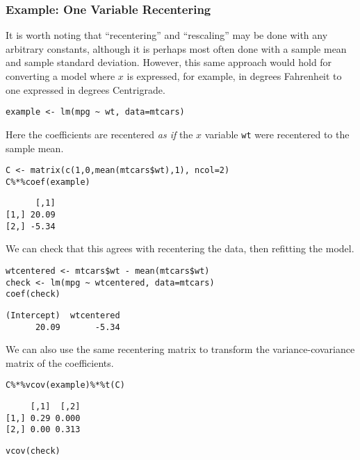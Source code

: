 \documentclass[]{article}
\begin{document}
\subsubsection{Example: One Variable
Recentering}\label{example-one-variable-recentering}

It is worth noting that ``recentering'' and ``rescaling'' may be done
with any arbitrary constants, although it is perhaps most often done
with a sample mean and sample standard deviation. However, this same
approach would hold for converting a model where \(x\) is expressed, for
example, in degrees Fahrenheit to one expressed in degrees Centrigrade.

\begin{verbatim}
example <- lm(mpg ~ wt, data=mtcars)
\end{verbatim}

Here the coefficients are recentered \emph{as if} the \(x\) variable
\texttt{wt} were recentered to the sample mean.

\begin{verbatim}
C <- matrix(c(1,0,mean(mtcars$wt),1), ncol=2)
C%*%coef(example)
\end{verbatim}

\begin{verbatim}
      [,1]
[1,] 20.09
[2,] -5.34
\end{verbatim}

We can check that this agrees with recentering the data, then refitting
the model.

\begin{verbatim}
wtcentered <- mtcars$wt - mean(mtcars$wt)
check <- lm(mpg ~ wtcentered, data=mtcars)
coef(check)
\end{verbatim}

\begin{verbatim}
(Intercept)  wtcentered 
      20.09       -5.34 
\end{verbatim}

We can also use the same recentering matrix to transform the
variance-covariance matrix of the coefficients.

\begin{verbatim}
C%*%vcov(example)%*%t(C)
\end{verbatim}

\begin{verbatim}
     [,1]  [,2]
[1,] 0.29 0.000
[2,] 0.00 0.313
\end{verbatim}

\begin{verbatim}
vcov(check)
\end{verbatim}
\end{document}
